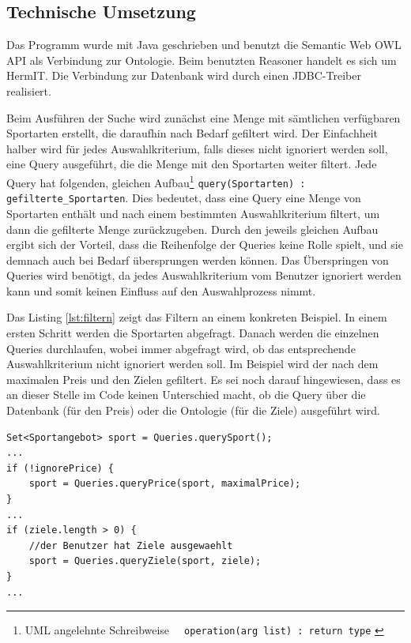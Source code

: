 \subsection{Technische Umsetzung}
Das Programm wurde mit Java geschrieben und benutzt die Semantic Web OWL API \autocite{semweb:owlapi} als Verbindung zur Ontologie. Beim benutzten Reasoner handelt es sich um HermIT\autocite{krr:hermit}. Die Verbindung zur Datenbank wird durch einen JDBC-Treiber\autocite{oracle:jdbc} realisiert.

Beim Ausführen der Suche wird zunächst eine Menge mit sämtlichen verfügbaren Sportarten erstellt, die daraufhin nach Bedarf gefiltert wird. Der Einfachheit halber wird für jedes Auswahlkriterium, falls dieses nicht ignoriert werden soll, eine Query ausgeführt, die die Menge mit den Sportarten weiter filtert. Jede Query hat folgenden, gleichen Aufbau\footnote{UML angelehnte Schreibweise \lstinline"  operation(arg list) : return type" \autocite{kow:umlclass}} \lstinline"query(Sportarten) : gefilterte_Sportarten". Dies bedeutet, dass eine Query eine Menge von Sportarten enthält und nach einem bestimmten Auswahlkriterium filtert, um dann die gefilterte Menge zurückzugeben. Durch den jeweils gleichen Aufbau ergibt sich der Vorteil, dass die Reihenfolge der Queries keine Rolle spielt, und sie demnach auch bei Bedarf übersprungen werden können. Das Überspringen von Queries wird benötigt, da jedes Auswahlkriterium vom Benutzer ignoriert werden kann und somit keinen Einfluss auf den Auswahlprozess nimmt.

Das Listing \ref{lst:filtern} zeigt das Filtern an einem konkreten Beispiel. In einem ersten Schritt werden die Sportarten abgefragt. Danach werden die einzelnen Queries durchlaufen, wobei immer abgefragt wird, ob das entsprechende Auswahlkriterium nicht ignoriert werden soll. Im Beispiel wird der nach dem maximalen Preis und den Zielen gefiltert. Es sei noch darauf hingewiesen, dass es an dieser Stelle im Code keinen Unterschied macht, ob die Query über die Datenbank (für den Preis) oder die Ontologie (für die Ziele) ausgeführt wird. 

\begin{lstlisting}[float=htbp, caption=Filtern von Sportarten, label=lst:filtern]
Set<Sportangebot> sport = Queries.querySport();
...        
if (!ignorePrice) {
	sport = Queries.queryPrice(sport, maximalPrice);
}
...
if (ziele.length > 0) {
	//der Benutzer hat Ziele ausgewaehlt
	sport = Queries.queryZiele(sport, ziele);
}
...                
\end{lstlisting}